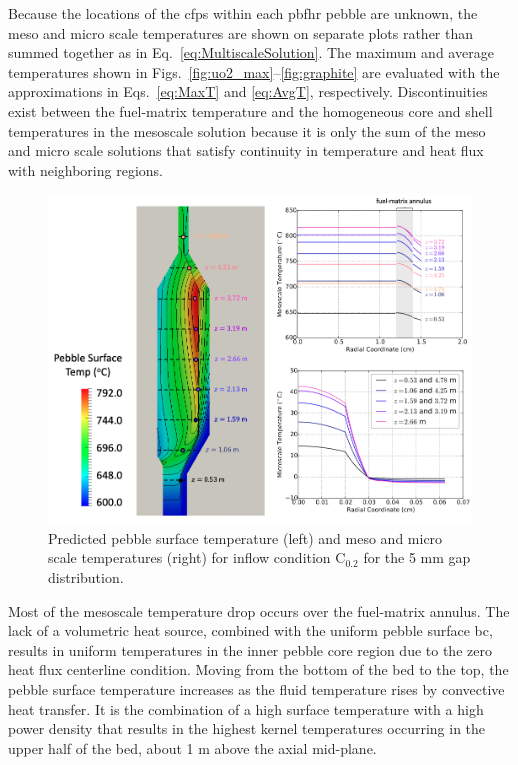 Because the locations of the \glspl{cfp} within each \gls{pbfhr} pebble are unknown, the meso and micro scale temperatures are shown on separate plots rather than summed together as in Eq.\ \eqref{eq:MultiscaleSolution}. The maximum and average temperatures shown in Figs.\ \ref{fig:uo2_max}--\ref{fig:graphite} are evaluated with the approximations in Eqs.\ \eqref{eq:MaxT} and \eqref{eq:AvgT}, respectively. Discontinuities exist between the fuel-matrix temperature and the homogeneous core and shell temperatures in the mesoscale solution because it is only the sum of the meso and micro scale solutions that satisfy continuity in temperature and heat flux with neighboring regions.

\begin{figure}[h!]
\centering
\includegraphics[width=0.9\linewidth]{figs/multiscale_fuel.png}
\caption{Predicted pebble surface temperature (left) and meso and micro scale temperatures (right) for inflow condition C$_\text{0.2}$ for the 5 \si{\milli\meter} gap distribution. }
\label{fig:multiscale_fuel}
\end{figure}

Most of the mesoscale temperature drop occurs over the fuel-matrix annulus. The lack of a volumetric heat source, combined with the uniform pebble surface \gls{bc}, results in uniform temperatures in the inner pebble core region due to the zero heat flux centerline condition. Moving from the bottom of the bed to the top, the pebble surface temperature increases as the fluid temperature rises by convective heat transfer. It is the combination of a high surface temperature with a high power density that results in the highest kernel temperatures occurring in the upper half of the bed, about 1 \si{\meter} above the axial mid-plane.

